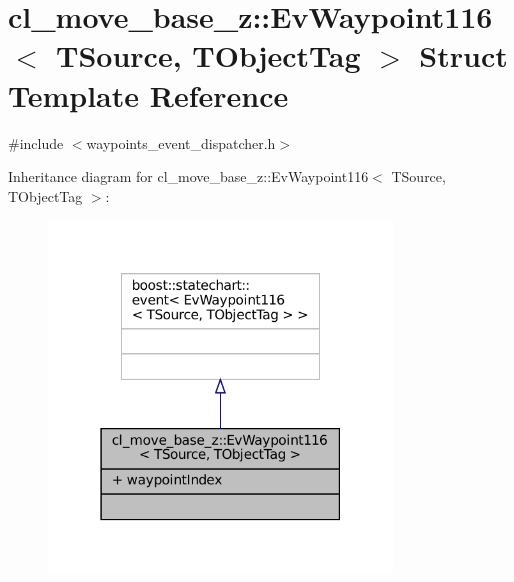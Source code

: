 \hypertarget{structcl__move__base__z_1_1EvWaypoint116}{}\section{cl\+\_\+move\+\_\+base\+\_\+z\+:\+:Ev\+Waypoint116$<$ T\+Source, T\+Object\+Tag $>$ Struct Template Reference}
\label{structcl__move__base__z_1_1EvWaypoint116}


{\ttfamily \#include $<$waypoints\+\_\+event\+\_\+dispatcher.\+h$>$}



Inheritance diagram for cl\+\_\+move\+\_\+base\+\_\+z\+:\+:Ev\+Waypoint116$<$ T\+Source, T\+Object\+Tag $>$\+:
\nopagebreak
\begin{figure}[H]
\begin{center}
\leavevmode
\includegraphics[width=259pt]{structcl__move__base__z_1_1EvWaypoint116__inherit__graph}
\end{center}
\end{figure}


